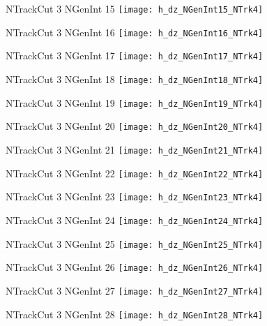 \documentclass[8pt]{beamer}
\begin{document}
\begin{frame}
\center
\large{NTrackCut 3 NGenInt 15}
\texttt{[image: h\_dz\_NGenInt15\_NTrk4]}
\end{frame}
\begin{frame}
\center
\large{NTrackCut 3 NGenInt 16}
\texttt{[image: h\_dz\_NGenInt16\_NTrk4]}
\end{frame}
\begin{frame}
\center
\large{NTrackCut 3 NGenInt 17}
\texttt{[image: h\_dz\_NGenInt17\_NTrk4]}
\end{frame}
\begin{frame}
\center
\large{NTrackCut 3 NGenInt 18}
\texttt{[image: h\_dz\_NGenInt18\_NTrk4]}
\end{frame}
\begin{frame}
\center
\large{NTrackCut 3 NGenInt 19}
\texttt{[image: h\_dz\_NGenInt19\_NTrk4]}
\end{frame}
\begin{frame}
\center
\large{NTrackCut 3 NGenInt 20}
\texttt{[image: h\_dz\_NGenInt20\_NTrk4]}
\end{frame}
\begin{frame}
\center
\large{NTrackCut 3 NGenInt 21}
\texttt{[image: h\_dz\_NGenInt21\_NTrk4]}
\end{frame}
\begin{frame}
\center
\large{NTrackCut 3 NGenInt 22}
\texttt{[image: h\_dz\_NGenInt22\_NTrk4]}
\end{frame}
\begin{frame}
\center
\large{NTrackCut 3 NGenInt 23}
\texttt{[image: h\_dz\_NGenInt23\_NTrk4]}
\end{frame}
\begin{frame}
\center
\large{NTrackCut 3 NGenInt 24}
\texttt{[image: h\_dz\_NGenInt24\_NTrk4]}
\end{frame}
\begin{frame}
\center
\large{NTrackCut 3 NGenInt 25}
\texttt{[image: h\_dz\_NGenInt25\_NTrk4]}
\end{frame}
\begin{frame}
\center
\large{NTrackCut 3 NGenInt 26}
\texttt{[image: h\_dz\_NGenInt26\_NTrk4]}
\end{frame}
\begin{frame}
\center
\large{NTrackCut 3 NGenInt 27}
\texttt{[image: h\_dz\_NGenInt27\_NTrk4]}
\end{frame}
\begin{frame}
\center
\large{NTrackCut 3 NGenInt 28}
\texttt{[image: h\_dz\_NGenInt28\_NTrk4]}
\end{frame}
\end{document}
